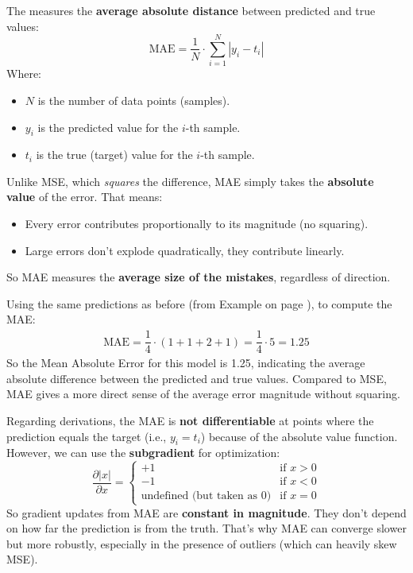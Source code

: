 \highspace
\begin{deepeningbox}
    The  measures the \textbf{average absolute distance} between predicted and true values:
    \begin{equation}
        \text{MAE} = \dfrac{1}{N} \cdot \displaystyle\sum_{i=1}^{N} \left|y_{i} - t_{i}\right|
    \end{equation}
    Where:
    \begin{itemize}
        \item $N$ is the number of data points (samples).
        \item $y_{i}$ is the predicted value for the $i$-th sample.
        \item $t_{i}$ is the true (target) value for the $i$-th sample.
    \end{itemize}
    Unlike MSE, which \emph{squares} the difference, MAE simply takes the \textbf{absolute value} of the error. That means:
    \begin{itemize}
        \item Every error contributes proportionally to its magnitude (no squaring).
        \item Large errors don't explode quadratically, they contribute linearly.
    \end{itemize}
    So MAE measures the \textbf{average size of the mistakes}, regardless of direction.

    \highspace
    \begin{examplebox}
        Using the same predictions as before (from Example on page \pageref{ex:mse-calculation}), to compute the MAE:
        \begin{align*}
            \text{MAE} = \dfrac{1}{4} \cdot \left(1 + 1 + 2 + 1\right) = \dfrac{1}{4} \cdot 5 = 1.25
        \end{align*}
        So the Mean Absolute Error for this model is 1.25, indicating the average absolute difference between the predicted and true values. Compared to MSE, MAE gives a more direct sense of the average error magnitude without squaring.
    \end{examplebox}

    Regarding derivations, the MAE is \textbf{not differentiable} at points where the prediction equals the target (i.e., $y_i = t_i$) because of the absolute value function. However, we can use the \textbf{subgradient} for optimization:
    \begin{equation}
        \dfrac{\partial \left|x\right|}{\partial x} = \begin{cases}
            +1 & \text{if } x > 0 \\[.5em]
            -1 & \text{if } x < 0 \\[.5em]
            \text{undefined (but taken as 0)} & \text{if } x = 0
        \end{cases}
    \end{equation}
    So gradient updates from MAE are \textbf{constant in magnitude}. They don't depend on how far the prediction is from the truth. That's why MAE can converge slower but more robustly, especially in the presence of outliers (which can heavily skew MSE).


\end{deepeningbox}
